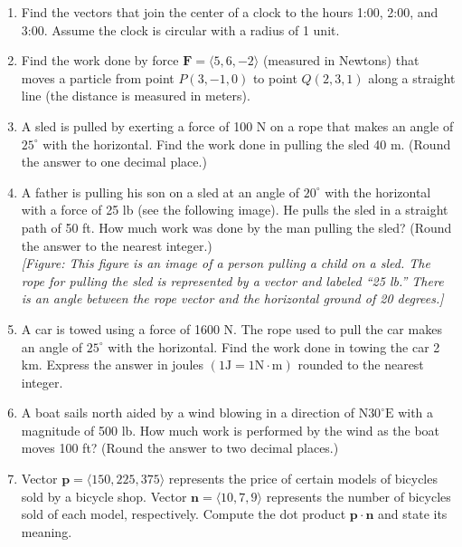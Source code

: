 \documentclass{exercises}
\begin{document}
\begin{enumerate}[resume]
\begin{enumerate}[label=(\alph*)]
  \item Find the distance between the hydrogen atoms located at P and R.
  \item Find the angle between vectors $\overset{\to}{OS}$ and $\overset{\to}{OR}$ that connect the carbon atom with the hydrogen atoms located at S and R, which is also called the bond angle. Express the answer in degrees rounded to two decimal places.
\end{enumerate}
\item \techrequired Find the vectors that join the center of a clock to the hours 1:00, 2:00, and 3:00. Assume the clock is circular with a radius of 1 unit.
\item Find the work done by force $\mathbf{F}=\langle5,6,-2\rangle$ (measured in Newtons) that moves a particle from point $P(3,-1,0)$ to point $Q(2,3,1)$ along a straight line (the distance is measured in meters).
\item \techrequired A sled is pulled by exerting a force of 100 N on a rope that makes an angle of $25^\circ$ with the horizontal. Find the work done in pulling the sled 40 m. (Round the answer to one decimal place.)
\item \techrequired A father is pulling his son on a sled at an angle of $20^\circ$ with the horizontal with a force of 25 lb (see the following image). He pulls the sled in a straight path of 50 ft. How much work was done by the man pulling the sled? (Round the answer to the nearest integer.) \\ \textit{[Figure: This figure is an image of a person pulling a child on a sled. The rope for pulling the sled is represented by a vector and labeled ``25 lb.'' There is an angle between the rope vector and the horizontal ground of 20 degrees.]}
\item \techrequired A car is towed using a force of 1600 N. The rope used to pull the car makes an angle of $25^\circ$ with the horizontal. Find the work done in towing the car 2 km. Express the answer in joules $(1\text{J}=1\text{N}\cdot \text{m})$ rounded to the nearest integer.
\item \techrequired A boat sails north aided by a wind blowing in a direction of $\text{N}30^\circ\text{E}$ with a magnitude of 500 lb. How much work is performed by the wind as the boat moves 100 ft? (Round the answer to two decimal places.)
\item Vector $\mathbf{p}=\langle150,225,375\rangle$ represents the price of certain models of bicycles sold by a bicycle shop. Vector $\mathbf{n}=\langle10,7,9\rangle$ represents the number of bicycles sold of each model, respectively. Compute the dot product $\mathbf{p}\cdot \mathbf{n}$ and state its meaning.

\end{enumerate}
\end{document}
